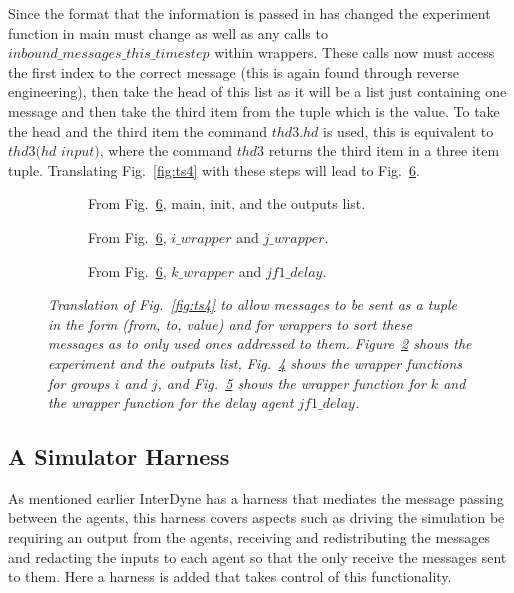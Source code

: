 \documentclass{article}
\begin{document}
Since the format that the information is passed in has changed the experiment function in main must change as well as any calls to $inbound\_messages\_this\_timestep$ within wrappers. These calls now must access the first index to the correct message (this is again found through reverse engineering), then take the head of this list as it will be a list just containing one message and then take the third item from the tuple which is the value. To take the head and the third item the command $thd3.hd$ is used, this is equivalent to $thd3(hd$ $input)$, where the command $thd3$ returns the third item in a three item tuple. Translating Fig.~\ref{fig:ts4} with these steps will lead to Fig.~\ref{fig:ts5}.
\begin{figure}[H]
	\centering
	\begin{subfigure}[b]{1\textwidth}
	
	\caption{From Fig.~\ref{fig:ts5}, main, init, and the outputs list.}
        \label{fig:ts51}
	\end{subfigure}
	\caption*{}
\end{figure}
	
\begin{figure}[H]\ContinuedFloat
	\centering
	\begin{subfigure}[b]{1\textwidth}
	
	\caption{From Fig.~\ref{fig:ts5}, $i\_wrapper$ and $j\_wrapper$.}
        \label{fig:ts52}
	\end{subfigure}
	\caption*{}
\end{figure}
	
\begin{figure}[H]\ContinuedFloat
	\centering
	\begin{subfigure}[b]{1\textwidth}
	
	\caption{From Fig.~\ref{fig:ts5}, $k\_wrapper$ and $jf1\_delay$.}
        \label{fig:ts53}
	\end{subfigure}
	\caption{\it Translation of Fig.~\ref{fig:ts4} to allow messages to be sent as a tuple in the form (from, to, value) and for wrappers to sort these messages as to only used ones addressed to them. Figure~\ref{fig:ts51} shows the experiment and the outputs list, Fig.~\ref{fig:ts52} shows the wrapper functions for groups $i$ and $j$, and Fig.~\ref{fig:ts53} shows the wrapper function for $k$ and the wrapper function for the delay agent $jf1\_delay$.}
	\label{fig:ts5}
\end{figure} 



\subsection{A Simulator Harness}
As mentioned earlier InterDyne has a harness that mediates the message passing between the agents, this harness covers aspects such as driving the simulation be requiring an output from the agents, receiving and redistributing the messages and redacting the inputs to each agent so that the only receive the messages sent to them. Here a harness is added that takes control of this functionality. 
\end{document}
